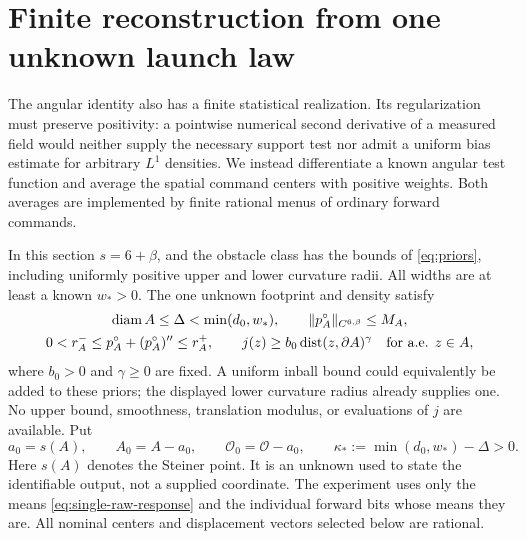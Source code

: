 \section{Finite reconstruction from one unknown launch law}
\label{sec:single-law-finite}
The angular identity also has a finite statistical realization.  Its
regularization must preserve positivity: a pointwise numerical second
derivative of a measured field would neither supply the necessary
support test nor admit a uniform bias estimate for arbitrary $L^1$
densities.  We instead differentiate a known angular test function and
average the spatial command centers with positive weights.  Both
averages are implemented by finite rational menus of ordinary forward
commands.

In this section $s=6+\beta$, and the obstacle class has the bounds of
\eqref{eq:priors}, including uniformly positive upper and lower
curvature radii.  All widths are at least a known $w_*>0$.  The one
unknown footprint and density satisfy
\begin{equation}\label{eq:single-finite-priors}
 \begin{gathered}
 \operatorname{diam} A\le\Delta<\min(d_0,w_*),\qquad
 \|p_A^\circ\|_{C^{6,\beta}}\le M_A,\\
 0<r_A^-\le p_A^\circ+(p_A^\circ)''\le r_A^+,
 \qquad j(z)\ge b_0\operatorname{dist}(z,\partial A)^\gamma
       \quad\hbox{for a.e. }z\in A,
 \end{gathered}
\end{equation}
where $b_0>0$ and $\gamma\ge0$ are fixed.  A uniform inball bound
could equivalently be added to these priors; the displayed lower
curvature radius already supplies one.  No upper bound, smoothness,
translation modulus, or evaluations of $j$ are available.  Put
\[
 a_0=s(A),\qquad A_0=A-a_0,\qquad
 \mathcal O_0=\mathcal O-a_0,
 \qquad \kappa_*:=\min(d_0,w_*)-\Delta>0.
\]
Here $s(A)$ denotes the Steiner point.  It is an unknown used to state
the identifiable output, not a supplied coordinate.  The experiment
uses only the means \eqref{eq:single-raw-response} and the individual
forward bits whose means they are.  All nominal centers and displacement
vectors selected below are rational.

